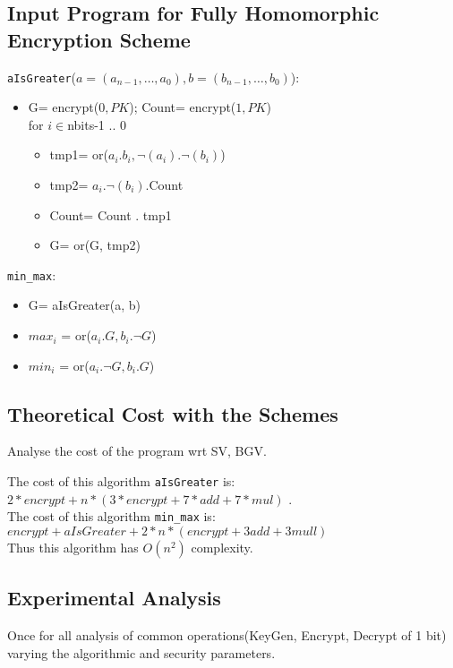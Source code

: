 \documentclass{acm_proc_article-sp}
\begin{document}
\subsection{Input Program for Fully Homomorphic Encryption Scheme}
\texttt{aIsGreater}($a=(a_{n-1},\ldots,a_0), b=(b_{n-1},\ldots,b_0)$):
\begin{itemize}
\item G= encrypt($0, PK$); Count= encrypt($1, PK$) \\
for $i \in $nbits-1 .. $0$
\begin{itemize}
\item tmp1= or($a_i.b_i , \neg(a_i).\neg(b_i)$)
\item tmp2= $a_i.\neg(b_i).$Count
\item Count= Count . tmp1
\item G= or(G, tmp2)
\end{itemize}
\end{itemize}
\texttt{min\_max}: 
\begin{itemize}
\item G= aIsGreater(a, b) 
\item $max_i$ = or($a_i.G, b_i. \neg{G}$)
\item $min_i$ = or($a_i.\neg{G}, b_i.G$)
\end{itemize}

\subsection{Theoretical Cost with the Schemes}

Analyse the cost of the program wrt SV, BGV.

The cost of this algorithm \texttt{aIsGreater} is:\\
 $2*encrypt+n*(3*encrypt+7*add+7*mul)$ .\\
The cost of this algorithm \texttt{min\_max} is:\\
$ encrypt+aIsGreater+2*n*(encrypt+3add+3mull)$\\
Thus this algorithm has $O(n^2)$ complexity. 

\subsection{Experimental Analysis}

Once for all analysis of common operations(KeyGen, Encrypt, Decrypt of 1 bit) varying the algorithmic and security parameters.
\end{document}
